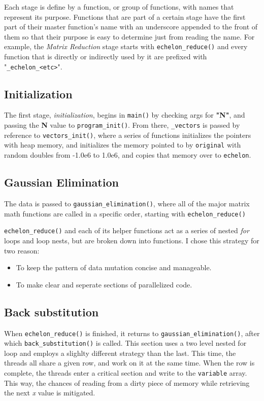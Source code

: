 \documentclass[a4paper,12pt]{article}
\begin{document}
    Each stage is define by a function, or group of functions, with names that represent
    its purpose. Functions that are part of a certain stage have the first part of their
    master function's name with an underscore appended to the front of them so that their
    purpose is easy to determine just from reading the name. For example, the
    \emph{Matrix Reduction} stage starts with \texttt{echelon\_reduce()} and
    every function that is directly or indirectly used by it are prefixed with
    "\texttt{\_echelon\_<etc>}".

    \subsection*{Initialization}
    The first stage, \emph{initialization},  begins in \texttt{main()} by
    checking args for \textbf{"N"}, and passing the \textbf{N} value to \texttt{program\_init()}.
    From there, \texttt{\_vectors} is passed by reference to
    \texttt{vectors\_init()}, where a series of functions initializes the
    pointers with heap memory, and initializes the memory pointed to by
    \texttt{original} with random doubles from -1.0e6 to 1.0e6, and copies that
    memory over to \texttt{echelon}.

    \subsection*{Gaussian Elimination}
    The data is passed to \texttt{gaussian\_elimination()}, where all of the major
    matrix math functions are called in a specific order, starting with
    \texttt{echelon\_reduce()}

    \texttt{echelon\_reduce()} and each of its helper functions act as a
    series of nested \emph{for} loops and loop nests, but are broken down into
    functions. I chose this strategy for two reason:
    \begin{itemize}
    \item To keep the pattern of data mutation concise and manageable.
    \item To make clear and seperate sections of parallelized code.
    \end{itemize}
    \subsection*{Back substitution}
    When \texttt{echelon\_reduce()} is finished, it returns to
    \texttt{gaussian\_elimination()}, after which \texttt{back\_substitution()}
    is called. This section uses a two level nested for loop and employs a
    slighlty different strategy than the last.
    This time, the threads all share a given row, and work on it at the same
    time. When the row is complete, the threads enter a critical section and
    write to the \texttt{variable} array. This way, the chances of reading from
    a dirty piece of memory while retrieving the next \emph{x} value is
    mitigated.
\end{document}
